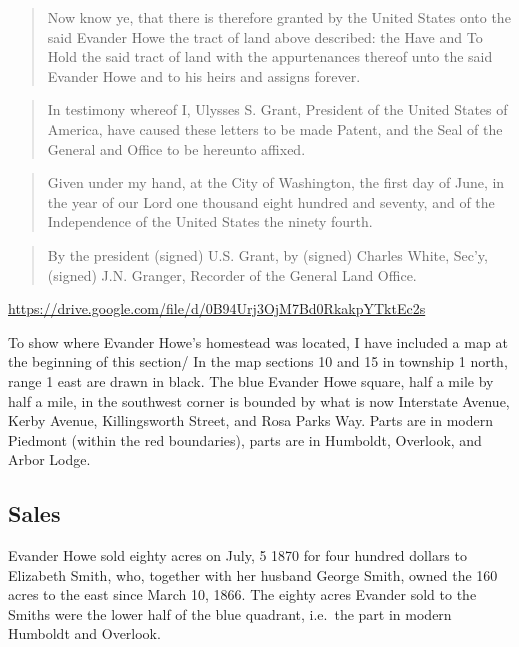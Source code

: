 \documentclass[
  12pt,
]{book}
\begin{document}
\begin{quote}
Now know ye, that there is therefore granted by the United States onto the said Evander Howe the tract of land above described: the Have and To Hold the said tract of land with the appurtenances thereof unto the said Evander Howe and to his heirs and assigns forever.
\end{quote}

\begin{quote}
In testimony whereof I, Ulysses S. Grant, President of the United States of America, have caused these letters to be made Patent, and the Seal of the General and Office to be hereunto affixed.
\end{quote}

\begin{quote}
Given under my hand, at the City of Washington, the first day of June, in the year of our Lord one thousand eight hundred and seventy, and of the Independence of the United States the ninety fourth.
\end{quote}

\begin{quote}
By the president (signed) U.S. Grant, by (signed) Charles White, Sec'y, (signed) J.N. Granger, Recorder of the General Land Office.
\end{quote}

\url{https://drive.google.com/file/d/0B94Urj3OjM7Bd0RkakpYTktEc2s}

To show where Evander Howe's homestead was located, I have included a map at the beginning of this section/ In the map sections 10 and 15 in township 1 north, range 1 east are drawn in black. The blue Evander Howe square, half a mile by half a mile, in the southwest corner is bounded by what is now Interstate Avenue, Kerby Avenue, Killingsworth Street, and Rosa Parks Way. Parts are in modern Piedmont (within the red boundaries), parts are in Humboldt, Overlook, and Arbor Lodge.

\hypertarget{sales}{%
\subsection{Sales}\label{sales}}

Evander Howe sold eighty acres on July, 5 1870 for four hundred dollars to Elizabeth Smith, who, together with her husband George Smith, owned the 160 acres to the east since March 10, 1866. The eighty acres Evander sold to the Smiths were the lower half of the blue quadrant, i.e.~the part in modern Humboldt and Overlook.
\end{document}
